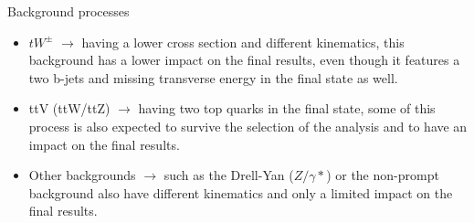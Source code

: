 \documentclass[handout,8 pt]{beamer}
\begin{document}
\begin{frame}{Background processes}
\begin{itemize}
	\item $t W^\pm$ $\rightarrow$ having a lower cross section and different kinematics, this background has a lower impact on the final results, even though it features a two b-jets and missing transverse energy in the final state as well. \\ \vspace{8pt} 
	\item ttV (ttW/ttZ) $\rightarrow$ having two top quarks in the final state, some of this process is also expected to survive the selection of the analysis and to have an impact on the final results. \\ \vspace{8pt} 
	\item Other backgrounds $\rightarrow$ such as the Drell-Yan ($Z/\gamma*$) or the non-prompt background also have different kinematics and only a limited impact on the final results. 
	\end{itemize} \vfill
	
\end{frame}
\end{document}
